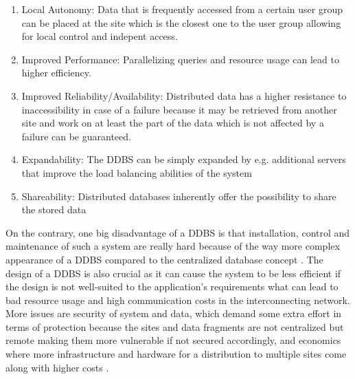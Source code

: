 \begin{enumerate}
    \item Local Autonomy: Data that is frequently accessed from a certain user group can be placed at the site which is the closest one to the user group
            allowing for local control and indepent access.
    \item Improved Performance: Parallelizing queries and resource usage can lead to higher efficiency.
    \item Improved Reliability/Availability: Distributed data has a higher resistance to inaccessibility in case of a failure because it may be retrieved from
            another site and work on at least the part of the data which is not affected by a failure can be guaranteed. 
    \item Expandability: The DDBS can be simply expanded by e.g. additional servers that improve the load balancing abilities of the system
    \item Shareability: Distributed databases inherently offer the possibility to share the stored data
\end{enumerate}

On the contrary, one big disadvantage of a DDBS is that installation, control and maintenance of such a system are really hard because of the way
more complex appearance of a DDBS compared to the centralized database concept \citep{Jadhav2017}. The design of a DDBS is also crucial as it can cause the 
system to be less efficient if the design is not well-suited to the application's requirements what can lead to bad resource usage and high communication 
costs in the interconnecting network. More issues are security of system and data, which demand some extra effort in terms of protection because the sites and 
data fragments are not centralized but remote making them more vulnerable if not secured accordingly, and economics where more infrastructure and hardware for 
a distribution to multiple sites come along with higher costs \cite{Kumar2013}.



